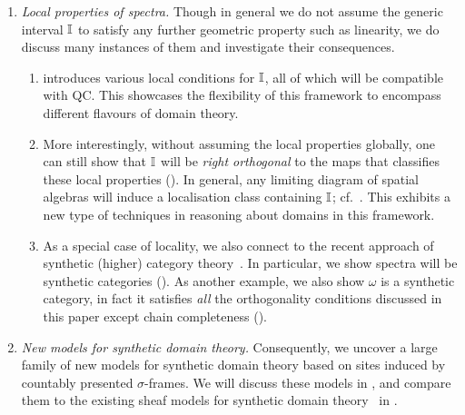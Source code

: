 \begin{enumerate}[leftmargin=*]
  \item \emph{Local properties of spectra.} Though in general we do not assume the generic interval $\mathbb{I}$ to satisfy any further geometric property such as linearity, we do discuss many instances of them and investigate their consequences.
  \begin{enumerate}

    \item {} introduces various local conditions for $\mathbb{I}$, all of which will be compatible with \gls{QC}. This showcases the flexibility of this framework to encompass different flavours of domain theory.

    \item  More interestingly, without assuming the local properties globally, one can still show that $\mathbb{I}$ will be \emph{right orthogonal} to the maps that classifies these local properties (). In general, any limiting diagram of spatial algebras will induce a localisation class containing $\mathbb{I}$; cf.\ . This exhibits a new type of techniques in reasoning about domains in this framework.
    
    \item As a special case of locality, we also connect to the recent approach of synthetic (higher) category theory~\citep{riehl2017type,buchholtz2021synthetic,gratzer2024directed}. In particular, we show spectra will be synthetic categories (). As another example, we also show $\omega$ is a synthetic category, in fact it satisfies \emph{all} the orthogonality conditions discussed in this paper except chain completeness ().
  \end{enumerate}

  \item \emph{New models for synthetic domain theory.} Consequently, we uncover a large family of new models for synthetic domain theory based on sites induced by countably presented $\sigma$-frames. We will discuss these models in , and compare them to the existing sheaf models for synthetic domain theory~\citep{FIORE1997151} in .
\end{enumerate}

